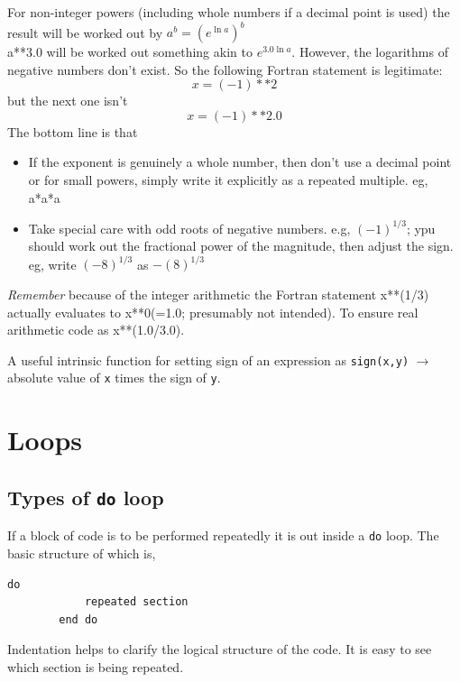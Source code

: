 \documentclass[12pt,oneside]{book}
\newcommand{\code}[1]{\lstinline[keywordstyle=\color{black},basicstyle=\ttfamily]{#1}}
\begin{document}
    For non-integer powers (including whole numbers if a decimal point is used) the result will be worked out by $ \displaystyle a^{\displaystyle b}=(\displaystyle e^{\displaystyle\ln a})^{\displaystyle b} $\\
    a**3.0 will be worked out something akin to $ e^{\displaystyle3.0\ln a} $. 
    However, the logarithms of negative numbers don't exist. 
    So the following Fortran statement is legitimate:
    \[x=(-1)**2\]but the next one isn't\[x=(-1)**2.0\]
    The bottom line is that
    \begin{itemize}
        \item If the exponent is genuinely a whole number, then don't use a decimal point or for small powers, simply write it explicitly as a repeated multiple. eg, a*a*a
        \item Take special care with odd roots of negative numbers. e.g, $ (-1)^{1/3} $; ypu should work out the fractional power of the magnitude, then adjust the sign. eg, write $ (-8)^{1/3} $ as $ -(8)^{1/3} $
    \end{itemize}
    \emph{Remember} because of the integer arithmetic the Fortran statement x**(1/3) actually evaluates to x**0(=1.0; presumably not intended). To ensure real arithmetic code as x**(1.0/3.0).

    A useful intrinsic function for setting sign of an expression as \code{sign(x,y)} $ \to $ absolute value of \code{x} times the sign of \code{y}.
    \chapter{Loops}
    \section{Types of \code{do} loop}
    If a block of code is to be performed repeatedly it is out inside a \code{do} loop. The basic structure of which is,
    \begin{lstlisting}[numbers=none]
        do
            repeated section
        end do
    \end{lstlisting}
    Indentation helps to clarify the logical structure of the code. It is easy to see which section is being repeated.\\
\end{document}
